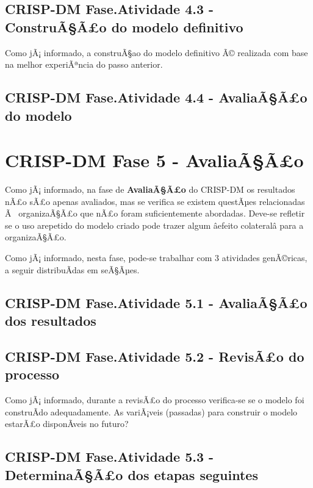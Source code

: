 \documentclass[]{article}
\begin{document}
\subsection{CRISP-DM Fase.Atividade 4.3 - ConstruÃ§Ã£o do modelo
definitivo}\label{crisp-dm-fase.atividade-4.3---construaao-do-modelo-definitivo}

Como jÃ¡ informado, a construÃ§ao do modelo definitivo Ã© realizada com
base na melhor experiÃªncia do passo anterior.

\subsection{CRISP-DM Fase.Atividade 4.4 - AvaliaÃ§Ã£o do
modelo}\label{crisp-dm-fase.atividade-4.4---avaliaaao-do-modelo}

\section{\texorpdfstring{CRISP-DM Fase 5 -
\textbf{AvaliaÃ§Ã£o}}{CRISP-DM Fase 5 - AvaliaÃ§Ã£o}}\label{crisp-dm-fase-5---avaliaaao}

Como jÃ¡ informado, na fase de \textbf{AvaliaÃ§Ã£o} do CRISP-DM os
resultados nÃ£o sÃ£o apenas avaliados, mas se verifica se existem
questÃµes relacionadas Ã~ organizaÃ§Ã£o que nÃ£o foram suficientemente
abordadas. Deve-se refletir se o uso arepetido do modelo criado pode
trazer algum âefeito colateralâ para a organizaÃ§Ã£o.

Como jÃ¡ informado, nesta fase, pode-se trabalhar com 3 atividades
genÃ©ricas, a seguir distribuÃ­das em seÃ§Ãµes.

\subsection{CRISP-DM Fase.Atividade 5.1 - AvaliaÃ§Ã£o dos
resultados}\label{crisp-dm-fase.atividade-5.1---avaliaaao-dos-resultados}

\subsection{CRISP-DM Fase.Atividade 5.2 - RevisÃ£o do
processo}\label{crisp-dm-fase.atividade-5.2---revisao-do-processo}

Como jÃ¡ informado, durante a revisÃ£o do processo verifica-se se o
modelo foi construÃ­do adequadamente. As variÃ¡veis (passadas) para
construir o modelo estarÃ£o disponÃ­veis no futuro?

\subsection{CRISP-DM Fase.Atividade 5.3 - DeterminaÃ§Ã£o dos etapas
seguintes}\label{crisp-dm-fase.atividade-5.3---determinaaao-dos-etapas-seguintes}
\end{document}
